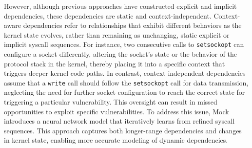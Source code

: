
However, although previous approaches have constructed explicit and implicit dependencies, these dependencies are static and context-independent. Context-aware dependencies refer to relationships that exhibit different behaviors as the kernel state evolves, rather than remaining as unchanging, static explicit or implicit syscall sequences. For instance, two consecutive calls to \texttt{setsockopt} can configure a socket differently, altering the socket's state or the behavior of the protocol stack in the kernel, thereby placing it into a specific context that triggers deeper kernel code paths. In contrast, context-independent dependencies assume that a \texttt{write} call should follow the \texttt{setsockopt} call for data transmission, neglecting the need for further socket configuration to reach the correct state for triggering a particular vulnerability. This oversight can result in missed opportunities to exploit specific vulnerabilities. To address this issue, Mock \cite{Xu2024MOCKOK} introduces a neural network model that iteratively learns from refined syscall sequences. This approach captures both longer-range dependencies and changes in kernel state, enabling more accurate modeling of dynamic dependencies.

